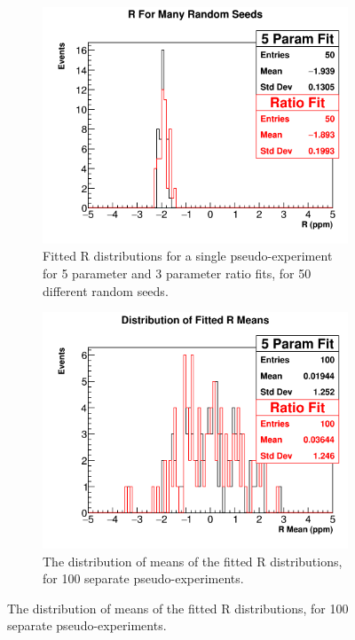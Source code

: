 	\begin{figure}[h]
	\centering
	    \begin{subfigure}[t]{0.45\textwidth}
		    \centering
			\includegraphics[width=\textwidth]{singleDist_canvas}
		    \caption{Fitted R distributions for a single pseudo-experiment for 5 parameter and 3 parameter ratio fits, for 50 different random seeds.}
		\label{Subfig:SingleRDist}
	    \end{subfigure}
	   	\hspace{4mm}
	    \begin{subfigure}[t]{0.45\textwidth}
		    \centering
			\includegraphics[width=\textwidth]{mean_canvas}
		    \caption{The distribution of means of the fitted R distributions, for 100 separate pseudo-experiments.}

\end{subfigure}
\end{figure}
